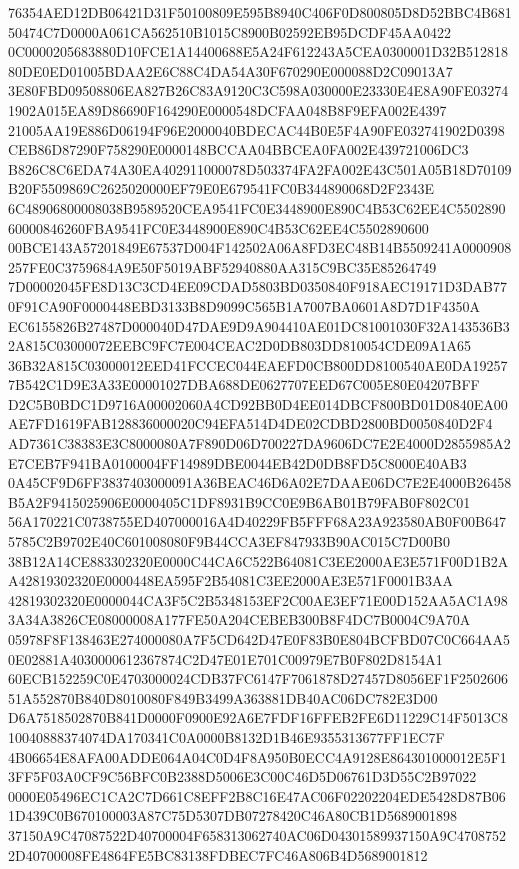 \documentclass[UTF8,fontset=fandol,zihao=-4,a4paper]{ctexart}
\begin{document}
{{76354AED12DB06421D31F50100809E595B8940C406F0D800805D8D52BBC4B68150474C7D0000A061CA562510B1015C8900B02592EB95DCDF45AA0422
0C0000205683880D10FCE1A14400688E5A24F612243A5CEA0300001D32B51281880DE0ED01005BDAA2E6C88C4DA54A30F670290E000088D2C09013A7
3E80FBD09508806EA827B26C83A9120C3C598A030000E23330E4E8A90FE032741902A015EA89D86690F164290E0000548DCFAA048B8F9EFA002E4397
21005AA19E886D06194F96E2000040BDECAC44B0E5F4A90FE032741902D0398CEB86D87290F758290E0000148BCCAA04BBCEA0FA002E439721006DC3
B826C8C6EDA74A30EA402911000078D503374FA2FA002E43C501A05B18D70109B20F5509869C2625020000EF79E0E679541FC0B344890068D2F2343E
6C48906800008038B9589520CEA9541FC0E3448900E890C4B53C62EE4C550289060000846260FBA9541FC0E3448900E890C4B53C62EE4C5502890600
00BCE143A57201849E67537D004F142502A06A8FD3EC48B14B5509241A0000908257FE0C3759684A9E50F5019ABF52940880AA315C9BC35E85264749
7D00002045FE8D13C3CD4EE09CDAD5803BD0350840F918AEC19171D3DAB770F91CA90F0000448EBD3133B8D9099C565B1A7007BA0601A8D7D1F4350A
EC6155826B27487D000040D47DAE9D9A904410AE01DC81001030F32A143536B32A815C03000072EEBC9FC7E004CEAC2D0DB803DD810054CDE09A1A65
36B32A815C03000012EED41FCCEC044EAEFD0CB800DD8100540AE0DA192577B542C1D9E3A33E00001027DBA688DE0627707EED67C005E80E04207BFF
D2C5B0BDC1D9716A00002060A4CD92BB0D4EE014DBCF800BD01D0840EA00AE7FD1619FAB128836000020C94EFA514D4DE02CDBD2800BD0050840D2F4
AD7361C38383E3C8000080A7F890D06D700227DA9606DC7E2E4000D2855985A2E7CEB7F941BA0100004FF14989DBE0044EB42D0DB8FD5C8000E40AB3
0A45CF9D6FF3837403000091A36BEAC46D6A02E7DAAE06DC7E2E4000B26458B5A2F9415025906E0000405C1DF8931B9CC0E9B6AB01B79FAB0F802C01
56A170221C0738755ED407000016A4D40229FB5FFF68A23A923580AB0F00B6475785C2B9702E40C601008080F9B44CCA3EF847933B90AC015C7D00B0
38B12A14CE883302320E0000C44CA6C522B64081C3EE2000AE3E571F00D1B2AA42819302320E0000448EA595F2B54081C3EE2000AE3E571F0001B3AA
42819302320E0000044CA3F5C2B5348153EF2C00AE3EF71E00D152AA5AC1A983A34A3826CE08000008A177FE50A204CEBEB300B8F4DC7B0004C9A70A
05978F8F138463E274000080A7F5CD642D47E0F83B0E804BCFBD07C0C664AA50E02881A4030000612367874C2D47E01E701C00979E7B0F802D8154A1
60ECB152259C0E4703000024CDB37FC6147F7061878D27457D8056EF1F250260651A552870B840D8010080F849B3499A363881DB40AC06DC782E3D00
D6A7518502870B841D0000F0900E92A6E7FDF16FFEB2FE6D11229C14F5013C810040888374074DA170341C0A0000B8132D1B46E9355313677FF1EC7F
4B06654E8AFA00ADDE064A04C0D4F8A950B0ECC4A9128E864301000012E5F13FF5F03A0CF9C56BFC0B2388D5006E3C00C46D5D06761D3D55C2B97022
0000E05496EC1CA2C7D661C8EFF2B8C16E47AC06F02202204EDE5428D87B061D439C0B670100003A87C75D5307DB07278420C46A80CB1D5689001898
37150A9C47087522D40700004F658313062740AC06D04301589937150A9C47087522D40700008FE4864FE5BC83138FDBEC7FC46A806B4D5689001812
}}
\end{document}

